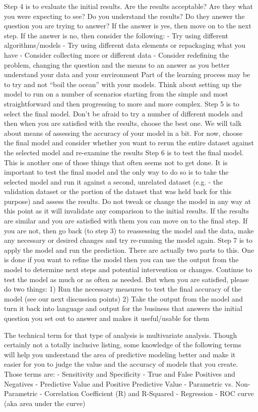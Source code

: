Step 4 is to evaluate the initial results. Are the results acceptable? Are they what you were expecting
to see? Do you understand the results? Do they answer the question you are trying to answer? If the
answer is yes, then move on to the next step. If the answer is no, then consider the following:
- Try using different algorithms/models
- Try using different data elements or repackaging what you have
- Consider collecting more or different data
- Consider redefining the problem, changing the question and the means to an answer as you
better understand your data and your environment
Part of the learning process may be to try and not “boil the ocean” with your models. Think about
setting up the model to run on a number of scenarios starting from the simple and most straightforward
and then progressing to more and more complex.
Step 5 is to select the final model. Don’t be afraid to try a number of different models and then when
you are satisfied with the results, choose the best one. We will talk about means of assessing the
accuracy of your model in a bit. For now, choose the final model and consider whether you want to rerun
the entire dataset against the selected model and re-examine the results
Step 6 is to test the final model. This is another one of those things that often seems not to get done.
It is important to test the final model and the only way to do so is to take the selected model and run it
against a second, unrelated dataset (e.g. - the validation dataset or the portion of the dataset that was
held back for this purpose) and assess the results. Do not tweak or change the model in any way at this
point as it will invalidate any comparison to the initial results. If the results are similar and you are
satisfied with them you can move on to the final step. If you are not, then go back (to step 3) to
reassessing the model and the data, make any necessary or desired changes and try re-running the
model again.
Step 7 is to apply the model and run the prediction. There are actually two parts to this. One is done if
you want to refine the model then you can use the output from the model to determine next steps and
potential intervention or changes. Continue to test the model as much or as often as needed. But when
you are satisfied, please do two things:
1) Run the necessary measures to test the final accuracy of the model (see our next discussion
points)
2) Take the output from the model and turn it back into language and output for the business
that answers the initial question you set out to answer and makes it useful/usable for them 


The technical term for that type of analysis is multivariate analysis. Though certainly not a
totally inclusive listing, some knowledge of the following terms will help you understand the area of
predictive modeling better and make it easier for you to judge the value and the accuracy of models that
you create. Those terms are:
- Sensitivity and Specificity
- True and False Positives and Negatives
- Predictive Value and Positive Predictive Value
- Parametric vs. Non-Parametric
- Correlation Coefficient (R) and R-Squared
- Regression
- ROC curve (aka area under the curve)
